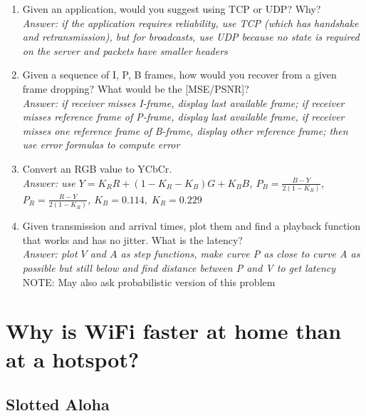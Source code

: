 \documentclass{article}
\newcommand{\MatrixVariable}[1]{\bm{\mathit{#1}}}
\begin{document}
\begin{enumerate}
\item Given an application, would you suggest using TCP or UDP? Why? \\
\textit{Answer: if the application requires reliability, use TCP (which has handshake and retransmission), but for broadcasts, use UDP because no state is required on the server and packets have smaller headers}
\item Given a sequence of I, P, B frames, how would you recover from a given frame dropping? What would be the [MSE/PSNR]? \\
\textit{Answer: if receiver misses I-frame, display last available frame; if receiver misses reference frame of P-frame, display last available frame, if receiver misses one reference frame of B-frame, display other reference frame; then use error formulas to compute error}
\item Convert an RGB value to YCbCr. \\
\textit{Answer: use $Y = K_RR + (1-K_R-K_B)G + K_BB$, $P_B = \frac{B-Y}{2(1-K_B)}$, $P_R = \frac{R-Y}{2(1-K_R)}$, $K_B = 0.114, \; K_R = 0.229$}
\item Given transmission and arrival times, plot them and find a playback function that works and has no jitter. What is the latency? \\
\textit{Answer: plot $\MatrixVariable{V}$ and $\MatrixVariable{A}$ as step functions, make curve P as close to curve A as possible but still below and find distance between P and V to get latency} \\
NOTE: May also ask probabilistic version of this problem
\end{enumerate}

\section{Why is WiFi faster at home than at a hotspot?}

\subsection{Slotted Aloha}
\end{document}
